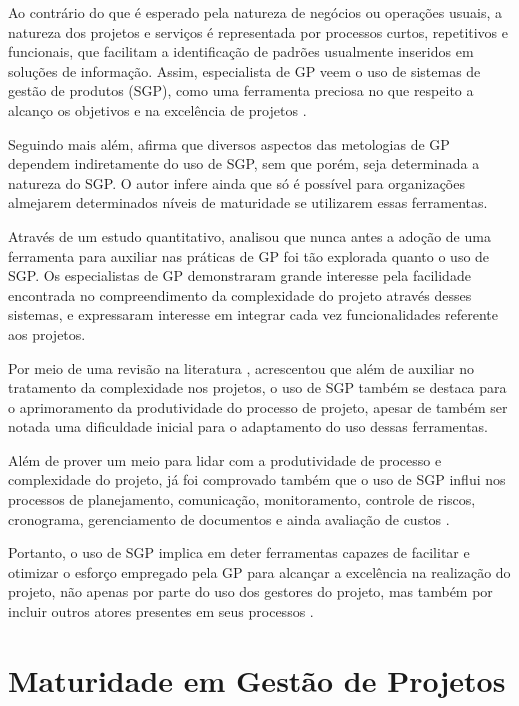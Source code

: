   Ao contrário do que é esperado pela natureza de negócios ou operações usuais, a natureza dos projetos e serviços é representada por processos curtos, repetitivos e funcionais, que facilitam a identificação de padrões usualmente inseridos em soluções de informação. Assim, especialista de GP veem o uso de sistemas de gestão de produtos (SGP), como uma ferramenta preciosa no que respeito a alcanço os objetivos e na excelência de projetos \cite{cserban2011project}.

  Seguindo mais além,  afirma que diversos aspectos das metologias de GP dependem indiretamente do uso de SGP, sem que porém, seja determinada a natureza do SGP. O autor infere ainda que só é possível para organizações almejarem determinados níveis de maturidade se utilizarem essas ferramentas.

  Através de um estudo quantitativo,  analisou que nunca antes a adoção de uma ferramenta para auxiliar nas práticas de GP foi tão explorada quanto o uso de SGP. Os especialistas de GP demonstraram grande interesse pela facilidade encontrada no compreendimento da complexidade do projeto através desses sistemas, e expressaram interesse em integrar cada vez funcionalidades referente aos projetos.

  Por meio de uma revisão na literatura , acrescentou que além de auxiliar no tratamento da complexidade nos projetos, o uso de SGP também se destaca para o aprimoramento da produtividade do processo de projeto, apesar de também ser notada uma dificuldade inicial para o adaptamento do uso dessas ferramentas.

  Além de prover um meio para lidar com a produtividade de processo e complexidade do projeto, já foi comprovado também que o uso de SGP influi nos processos de planejamento, comunicação, monitoramento, controle de riscos, cronograma, gerenciamento de documentos e ainda avaliação de custos \cite{raymond2008project}.

  Portanto, o uso de SGP implica em deter ferramentas capazes de facilitar e otimizar o esforço empregado pela GP para alcançar a excelência na realização do projeto, não apenas por parte do uso dos gestores do projeto, mas também por incluir outros atores presentes em seus processos \cite{cserban2011project}.

\section{Maturidade em Gestão de Projetos}


